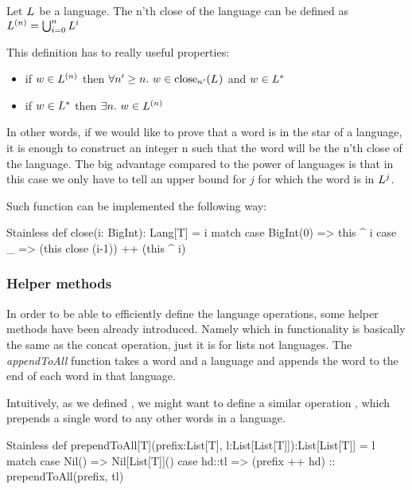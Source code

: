 \begin{definition}
	Let $L_{}$ be a language. The n'th close of the language can be defined as $ L^{(n)} = \bigcup_{i=0}^n L^{i}$
\end{definition}

This definition has to really useful properties:

\begin{itemize}
	\item if $w \in L^{(n)}$ then $\forall n' \ge n. ~ w \in \text{close}_{n'}(L_{})$ and $w \in L^{*}$
	\item if $w \in L^{*}$ then $\exists n. ~ w \in L^{(n)}$ 
\end{itemize}

In other words, if we would like to prove that a word is in the star of a language, it is enough to construct an integer n such that the word will be the n'th close of the language. The big advantage compared to the power of languages is that in this case we only have to tell an upper bound for $j$ for which the word is in $L^{j}$.

Such function can be implemented the following way:

\begin{ShortCode}{Stainless}
 def close(i: BigInt): Lang[T] = i match {
   case BigInt(0) => this ^ i
   case _ => (this close (i-1)) ++ (this ^ i)
 }
\end{ShortCode}

\subsubsection{Helper methods}

In order to be able to efficiently define the language operations, some helper methods have been already introduced. Namely  which in functionality is basically the same as the concat operation, just it is for lists not languages. The \emph{appendToAll} function takes a word and a language and appends the word to the end of each word in that language.

Intuitively, as we defined , we might want to define a similar operation , which prepends a single word to any other words in a language.

\begin{ShortCode}{Stainless}
 def prependToAll[T](prefix:List[T], 
                     l:List[List[T]]):List[List[T]] = l match {
   case Nil() => Nil[List[T]]()
   case hd::tl => (prefix ++ hd) :: prependToAll(prefix, tl) 
 }
\end{ShortCode}




